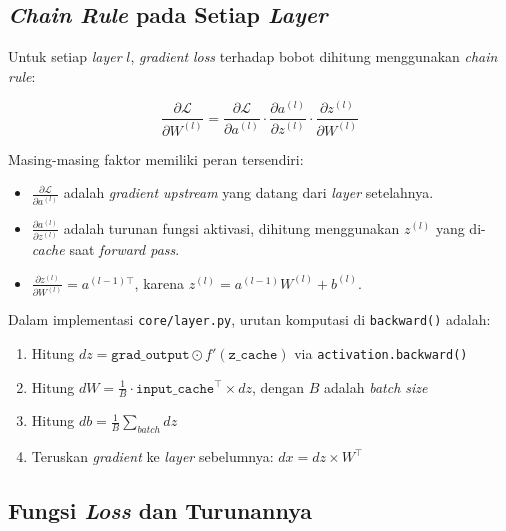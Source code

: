 \subsection{\textit{Chain Rule} pada Setiap \textit{Layer}}

Untuk setiap \textit{layer} $l$, \textit{gradient} \textit{loss} terhadap bobot dihitung menggunakan \textit{chain rule}:

\begin{equation}
    \frac{\partial \mathcal{L}}{\partial W^{(l)}} =
    \frac{\partial \mathcal{L}}{\partial a^{(l)}} \cdot
    \frac{\partial a^{(l)}}{\partial z^{(l)}} \cdot
    \frac{\partial z^{(l)}}{\partial W^{(l)}}
    \label{eq:chainrule}
\end{equation}

Masing-masing faktor memiliki peran tersendiri:
\begin{itemize}
    \item $\frac{\partial \mathcal{L}}{\partial a^{(l)}}$ adalah \textit{gradient upstream} yang datang dari \textit{layer} setelahnya.
    \item $\frac{\partial a^{(l)}}{\partial z^{(l)}}$ adalah turunan fungsi aktivasi, dihitung menggunakan $z^{(l)}$ yang di-\textit{cache} saat \textit{forward pass}.
    \item $\frac{\partial z^{(l)}}{\partial W^{(l)}} = a^{(l-1)\top}$, karena $z^{(l)} = a^{(l-1)} W^{(l)} + b^{(l)}$.
\end{itemize}

Dalam implementasi \texttt{core/layer.py}, urutan komputasi di \texttt{backward()} adalah:
\begin{enumerate}
    \item Hitung $dz = \texttt{grad\_output} \odot f'(\texttt{z\_cache})$ via \texttt{activation.backward()}
    \item Hitung $dW = \frac{1}{B} \cdot \texttt{input\_cache}^\top \times dz$, dengan $B$ adalah \textit{batch size}
    \item Hitung $db = \frac{1}{B} \sum_{batch} dz$
    \item Teruskan \textit{gradient} ke \textit{layer} sebelumnya: $dx = dz \times W^\top$
\end{enumerate}

\subsection{Fungsi \textit{Loss} dan Turunannya}

